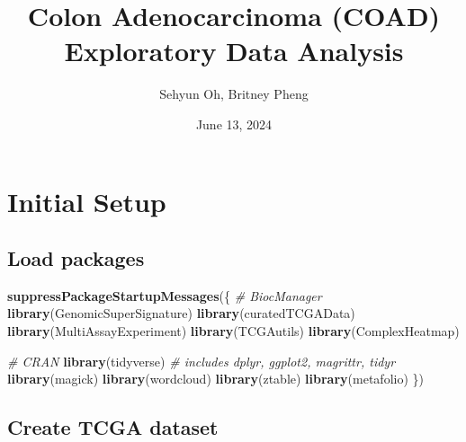 \documentclass[
]{article}
\title{Colon Adenocarcinoma (COAD) Exploratory Data Analysis}
\author{Sehyun Oh, Britney Pheng}
\date{June 13, 2024}
\newenvironment{Shaded}{\begin{snugshade}}{\end{snugshade}}
\newcommand{\CommentTok}[1]{\textcolor[rgb]{0.56,0.35,0.01}{\textit{#1}}}
\newcommand{\FunctionTok}[1]{\textcolor[rgb]{0.13,0.29,0.53}{\textbf{#1}}}
\newcommand{\NormalTok}[1]{#1}
\begin{document}
\maketitle

\hypertarget{initial-setup}{%
\section{Initial Setup}\label{initial-setup}}

\hypertarget{load-packages}{%
\subsection{Load packages}\label{load-packages}}

\begin{Shaded}
\begin{Highlighting}[]
\FunctionTok{suppressPackageStartupMessages}\NormalTok{(\{}
  \CommentTok{\# BiocManager}
  \FunctionTok{library}\NormalTok{(GenomicSuperSignature)}
  \FunctionTok{library}\NormalTok{(curatedTCGAData)}
  \FunctionTok{library}\NormalTok{(MultiAssayExperiment)}
  \FunctionTok{library}\NormalTok{(TCGAutils)}
  \FunctionTok{library}\NormalTok{(ComplexHeatmap)}
  
  \CommentTok{\# CRAN}
  \FunctionTok{library}\NormalTok{(tidyverse) }\CommentTok{\# includes dplyr, ggplot2, magrittr, tidyr}
  \FunctionTok{library}\NormalTok{(magick)}
  \FunctionTok{library}\NormalTok{(wordcloud)}
  \FunctionTok{library}\NormalTok{(ztable)}
  \FunctionTok{library}\NormalTok{(metafolio)}
\NormalTok{\})}
\end{Highlighting}
\end{Shaded}

\hypertarget{create-tcga-dataset}{%
\subsection{Create TCGA dataset}\label{create-tcga-dataset}}
\end{document}
